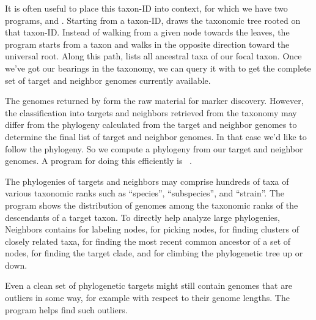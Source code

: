It is often useful to place this taxon-ID into context, for which we
have two programs,  and . Starting from a
taxon-ID,  draws the taxonomic tree rooted on that
taxon-ID. Instead of walking from a given node towards the leaves, the
program  starts from a taxon and walks in the opposite
direction toward the universal root. Along this path,  lists
all ancestral taxa of our focal taxon. Once we've got our bearings in
the taxonomy, we can query it with  to get the complete
set of target and neighbor genomes currently available.

The genomes returned by  form the raw material for
marker discovery. However, the classification into targets and
neighbors retrieved from the taxonomy may differ from the phylogeny
calculated from the target and neighbor genomes to determine the final
list of target and neighbor genomes. In that case we'd like to follow
the phylogeny. So we compute a phylogeny from our target and neighbor
genomes. A program for doing this efficiently
is ~\cite{klo20:phy}.

The phylogenies of targets and neighbors may comprise hundreds of taxa
of various taxonomic ranks such as ``species'', ``subspecies'', and
``strain''. The program  shows the distribution of genomes
among the taxonomic ranks of the descendants of a target taxon. To
directly help analyze large phylogenies, Neighbors contains 
for labeling nodes,  for picking nodes,
 for finding clusters of closely related
taxa,  for finding the most recent common ancestor of a set
of nodes,  for finding the target clade, and  for
climbing the phylogenetic tree up or down.

Even a clean set of phylogenetic targets might still contain genomes
that are outliers in some way, for example with respect to their
genome lengths. The program  helps find such
outliers.
